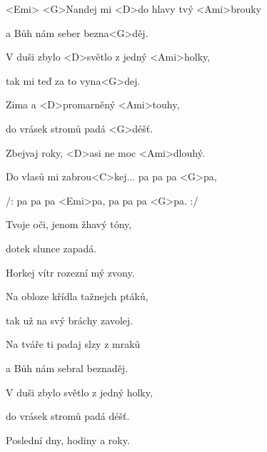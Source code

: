 

<Emi>
\zs
<G>Nandej mi <D>do hlavy tvý <Ami>brouky

a Bůh nám seber bezna<G>děj.

V duši zbylo <D>světlo z jedný <Ami>holky,

tak mi teď za to vyna<G>dej.

Zima a <D>promarněný <Ami>touhy,

do vrásek stromů padá <G>déšť.

Zbejvaj roky, <D>asi ne moc <Ami>dlouhý.

\ks
\zr

Do vlasů mi zabrou<C>kej... pa pa pa <G>pa,

/: pa pa pa <Emi>pa, pa pa pa <G>pa. :/
\kr

\zs
Tvoje oči, jenom žhavý tóny,

dotek slunce zapadá.

Horkej vítr rozezní mý zvony.

\ks
\zr \kr

\zs
Na obloze křídla tažnejch ptáků,

tak už na svý bráchy zavolej.

Na tváře ti padaj slzy z mraků

a Bůh nám sebral beznaděj.

V duši zbylo světlo z jedný holky,

do vrásek stromů padá déšť.

Poslední dny, hodiny a roky.

\ks

\zr
\kr

\kp
